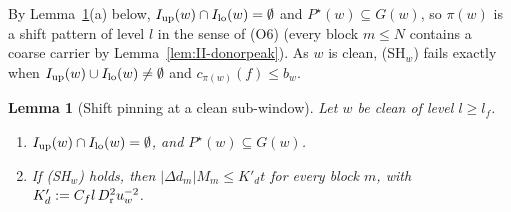 \documentclass[10pt]{amsart}
\newtheorem{lemma}[theorem]{Lemma}
\theoremstyle{definition}
\theoremstyle{remark}
\begin{document}
By Lemma~\ref{lem:II-shiftpin}(a) below, $I_{\rm up}(w)\cap
I_{\rm lo}(w)=\emptyset$ and $P^\star(w)\subseteq G(w)$, so $\pi(w)$ is a
shift pattern of level $l$ in the sense of (O6) (every block $m\le N$
contains a coarse carrier by Lemma~\ref{lem:II-donorpeak}).  As $w$ is
clean, (SH$_w$) fails exactly when $I_{\rm up}(w)\cup I_{\rm lo}(w)\ne
\emptyset$ and $c_{\pi(w)}(f)\le b_w$.

\begin{lemma}[Shift pinning at a clean sub-window]\label{lem:II-shiftpin}
Let $w$ be clean of level $l\ge l_f$.
\begin{enumerate}
\item[(a)] $I_{\rm up}(w)\cap I_{\rm lo}(w)=\emptyset$, and $P^\star(w)
\subseteq G(w)$.
\item[(b)] If \textup{(SH$_w$)} holds, then $|\Delta d_m|M_m\le K'_dt$ for every
block $m$, with $K'_d:=C_fl\,D_{\rm r}^2u_w^{-2}$.
\end{enumerate}
\end{lemma}
\end{document}
